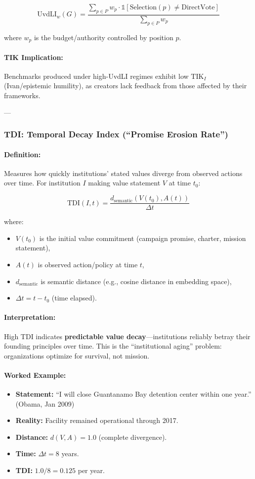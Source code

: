 \documentclass[11pt,a4paper]{article}
\theoremstyle{definition}
\theoremstyle{remark}
\begin{document}
\[
\text{UvdLI}_w(G) = \frac{\sum_{p \in P} w_p \cdot \mathbb{1}[\text{Selection}(p) \neq \text{DirectVote}]}{\sum_{p \in P} w_p}
\]

where $w_p$ is the budget/authority controlled by position $p$.

\paragraph{TIK Implication:}
Benchmarks produced under high-UvdLI regimes exhibit low $\text{TIK}_I$ (Ivan/epistemic humility), as creators lack feedback from those affected by their frameworks.

---

\subsubsection{TDI: Temporal Decay Index (``Promise Erosion Rate'')}

\paragraph{Definition:}
Measures how quickly institutions' stated values diverge from observed actions over time. For institution $I$ making value statement $V$ at time $t_0$:

\[
\text{TDI}(I, t) = \frac{d_{\text{semantic}}(V(t_0), A(t))}{\Delta t}
\]

where:
\begin{itemize}
\item $V(t_0)$ is the initial value commitment (campaign promise, charter, mission statement),
\item $A(t)$ is observed action/policy at time $t$,
\item $d_{\text{semantic}}$ is semantic distance (e.g., cosine distance in embedding space),
\item $\Delta t = t - t_0$ (time elapsed).
\end{itemize}

\paragraph{Interpretation:}
High TDI indicates \textbf{predictable value decay}—institutions reliably betray their founding principles over time. This is the ``institutional aging'' problem: organizations optimize for survival, not mission.

\paragraph{Worked Example:}
\begin{itemize}
\item \textbf{Statement:} ``I will close Guantanamo Bay detention center within one year.'' (Obama, Jan 2009)
\item \textbf{Reality:} Facility remained operational through 2017.
\item \textbf{Distance:} $d(V, A) = 1.0$ (complete divergence).
\item \textbf{Time:} $\Delta t = 8$ years.
\item \textbf{TDI:} $1.0 / 8 = 0.125$ per year.
\end{itemize}
\end{document}
